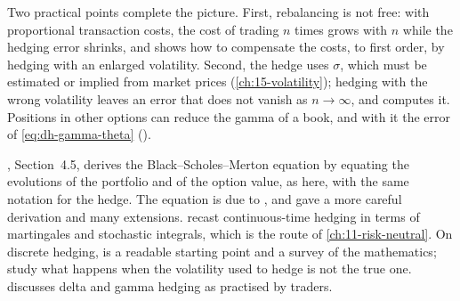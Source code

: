 Two practical points complete the picture. First, rebalancing is not free: with proportional
transaction costs, the cost of trading $n$ times grows with $n$ while the hedging error
shrinks, and \textcite{leland} shows how to compensate the costs, to first order, by hedging
with an enlarged volatility. Second, the hedge uses $\sigma$, which must be estimated or
implied from market prices (\cref{ch:15-volatility}); hedging with the wrong volatility leaves
an error that does not vanish as $n\to\infty$, and  computes it. Positions
in other options can reduce the gamma of a book, and with it the error of
\eqref{eq:dh-gamma-theta} ().


\furtherreading
\textcite{shreve2}, Section~4.5, derives the Black--Scholes--Merton equation by equating the
evolutions of the portfolio and of the option value, as here, with the same notation for the
hedge. The equation is due to \textcite{black-scholes}, and \textcite{merton1973} gave a more
careful derivation and many extensions. \textcite{harrison-pliska} recast continuous-time
hedging in terms of martingales and stochastic integrals, which is the route of
\cref{ch:11-risk-neutral}. On discrete hedging, \textcite{bertsimas-kogan-lo} is a readable
starting point and \textcite{geiss-gobet} a survey of the mathematics;
\textcite{el-karoui-jeanblanc-shreve} study what happens when the volatility used to hedge is
not the true one. \textcite{hull} discusses delta and gamma hedging as practised by traders.

